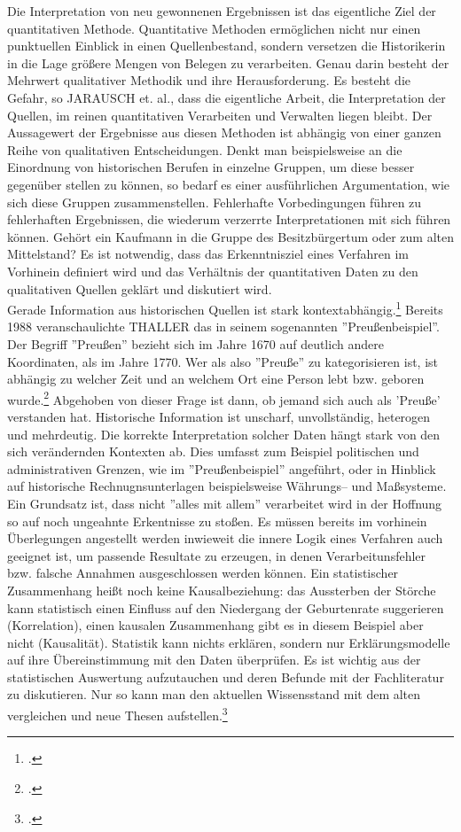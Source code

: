 \documentclass[12pt,a4paper]{article}
\begin{document}
Die Interpretation von neu gewonnenen Ergebnissen ist das eigentliche Ziel der quantitativen Methode. Quantitative Methoden ermöglichen nicht nur einen punktuellen Einblick in einen Quellenbestand, sondern versetzen die Historikerin in die Lage größere Mengen von Belegen zu verarbeiten. Genau darin besteht der Mehrwert qualitativer Methodik und ihre Herausforderung. Es besteht die Gefahr, so JARAUSCH et. al., dass die eigentliche Arbeit, die Interpretation der Quellen, im reinen quantitativen Verarbeiten und Verwalten liegen bleibt. Der Aussagewert der Ergebnisse aus diesen Methoden ist abhängig von einer ganzen Reihe von qualitativen Entscheidungen. Denkt man beispielsweise an die Einordnung von historischen Berufen in einzelne Gruppen, um diese besser gegenüber stellen zu können, so bedarf es einer ausführlichen Argumentation, wie sich diese Gruppen zusammenstellen. Fehlerhafte  Vorbedingungen führen zu fehlerhaften Ergebnissen, die wiederum verzerrte Interpretationen mit sich führen können. Gehört ein Kaufmann in die Gruppe des Besitzbürgertum oder zum alten Mittelstand? Es ist notwendig, dass das Erkenntnisziel eines Verfahren im Vorhinein definiert wird und das Verhältnis der quantitativen Daten zu den qualitativen Quellen geklärt und diskutiert wird.
\\
Gerade Information aus historischen Quellen ist stark kontextabhängig.\footcite[][S.182-193]{jarausch1985quantitative} Bereits 1988 veranschaulichte THALLER das in seinem sogenannten ''Preußenbeispiel''. Der Begriff ''Preußen'' bezieht sich im Jahre 1670 auf deutlich andere Koordinaten, als im Jahre 1770. Wer als also ''Preuße'' zu kategorisieren ist, ist abhängig zu welcher Zeit und an welchem Ort eine Person lebt bzw. geboren wurde.\footcite[][S.264-266]{thaller2017historical} Abgehoben von dieser Frage ist dann, ob jemand sich auch als 'Preuße' verstanden hat. Historische Information ist unscharf, unvollständig, heterogen und mehrdeutig. Die korrekte Interpretation solcher Daten hängt stark von den sich verändernden Kontexten ab. Dies umfasst zum Beispiel politischen und administrativen Grenzen, wie im ''Preußenbeispiel'' angeführt, oder in Hinblick auf historische Rechnugnsunterlagen beispielsweise Währungs-- und Maßsysteme.
\\
Ein Grundsatz ist, dass nicht ''alles mit allem'' verarbeitet wird in der Hoffnung so auf noch ungeahnte Erkentnisse zu stoßen. Es müssen bereits im vorhinein Überlegungen angestellt werden inwieweit die innere Logik eines Verfahren auch geeignet ist, um passende Resultate zu erzeugen, in denen Verarbeitunsfehler bzw. falsche Annahmen ausgeschlossen werden können. Ein statistischer Zusammenhang heißt noch keine Kausalbeziehung: das Aussterben der Störche kann statistisch einen Einfluss auf den Niedergang der Geburtenrate suggerieren (Korrelation), einen kausalen Zusammenhang gibt es in diesem Beispiel aber nicht (Kausalität). Statistik kann nichts erklären, sondern nur Erklärungsmodelle auf ihre Übereinstimmung mit den Daten überprüfen. Es ist wichtig aus der statistischen Auswertung aufzutauchen und deren Befunde mit der Fachliteratur zu diskutieren. Nur so kann man den aktuellen Wissensstand mit dem alten vergleichen und neue Thesen aufstellen.\footcite[][S.182-191]{jarausch1985quantitative}
\end{document}
